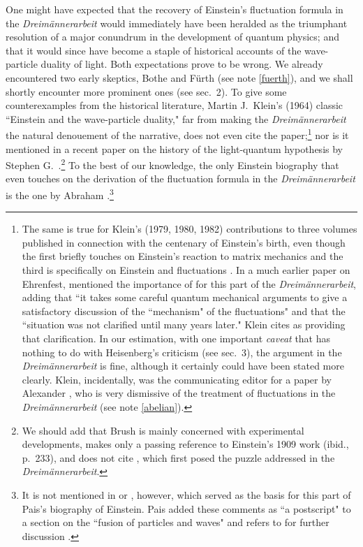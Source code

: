 \documentclass{elsart}
\begin{document}
One might have expected that the recovery of Einstein's fluctuation formula in the {\it Dreim\"annerarbeit} would immediately have been heralded as the triumphant resolution of a major conundrum in the development of quantum physics; and that it would since have become a staple of historical accounts of the wave-particle duality of light. Both expectations prove to be wrong. We already encountered two early skeptics, Bothe and F\"urth (see note \ref{fuerth}), and we shall shortly encounter more prominent ones (see sec.\ 2). To give some counterexamples from the historical literature, Martin J.\ Klein's (1964) classic ``Einstein and the wave-particle duality," far from making the {\it Dreim\"annerarbeit} the natural denouement of the narrative, does not even cite the paper;\footnote{The same is true for Klein's (1979, 1980, 1982) contributions to three volumes published in connection with the centenary of Einstein's birth, even though the first briefly touches on Einstein's reaction to matrix mechanics \citep[p.\ 149]{Klein 1979} and the third is specifically on Einstein and fluctuations \citep{Klein 1982}. In a much earlier paper on Ehrenfest, \citet[p.\ 50]{Klein 1959} mentioned the importance of \citep{Ehrenfest 1925a} for this part of the {\it Dreim\"annerarbeit}, adding that ``it takes some careful quantum mechanical arguments to give a satisfactory discussion of the ``mechanism" of the fluctuations" and that the ``situation was not clarified until many years later." Klein cites \citep{Heisenberg 1931} as providing that clarification. In our estimation, with one important {\it caveat} that has nothing to do with Heisenberg's criticism (see sec.\ 3), the argument in the {\it Dreim\"annerarbeit} is fine, although it certainly could have been stated more clearly. Klein, incidentally, was the communicating editor for  a paper by Alexander \citet{Bach 1989}, who is very dismissive of the treatment of fluctuations in the {\it Dreim\"annerarbeit} (see note \ref{abelian}).} nor is it mentioned in a recent paper on the history of the light-quantum hypothesis by Stephen G.\ \citet{Brush 2007}.\footnote{We should add that Brush is mainly concerned with experimental developments, makes only a passing reference to Einstein's 1909 work (ibid., p.\ 233), and does not cite \citep{Einstein 1909a, Einstein 1909b},  which first posed the puzzle addressed in the {\it Dreim\"annerarbeit}.} To the best of our knowledge, the only Einstein biography that even touches on the derivation of the fluctuation formula in the {\it Dreim\"annerarbeit} is the one by Abraham \citet[p.\ 405]{Pais 1982}.\footnote{It is not mentioned in \citep{Pais 1979} or \citep{Pais 1980}, however, which served as the basis for this part of Pais's biography of Einstein. Pais added these comments as ``a postscript" to a section on the ``fusion of particles and waves" and refers to \citep{Gonzalez and Wergeland 1973} for further discussion \citep[pp.\ 402--405]{Pais 1982}.} 
\end{document}

